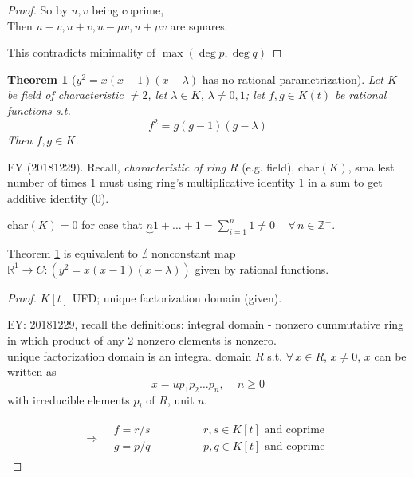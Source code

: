 \documentclass[10pt]{amsart}
\newtheorem{theorem}{Theorem}
\begin{document}
\begin{multicols*}{2}
\begin{proof}
	So by $u,v $ being coprime, \\
	\phantom{ \qquad \, } Then $u-v, u+v, u- \mu v, u + \mu v$ are squares.
	
	This contradicts minimality of $\max{(\deg{p}, \deg{q})}$


\end{proof}	





\begin{theorem}[$y^2 = x(x-1)(x-\lambda)$ has no rational parametrization]\label{Thm:SomeEqnHasNoRationalParametrization}
	Let $K$ be field of characteristic $\neq 2$, let $\lambda \in K$, $\lambda \neq 0, 1$; let $f,g \in K(t)$ be rational functions s.t.\[
	f^2 = g(g-1)(g-\lambda)
	\]
	Then $f, g\in K$. 	
\end{theorem}
	EY (20181229). Recall, \emph{characteristic of ring} $R$ (e.g. field), $\text{char}(K)$, smallest number of times $1$ must using ring's multiplicative identity $1$ in a sum to get additive identity ($0$). 
	
	$\text{char}(K) = 0$ for case that $\underbrace{n}{1 + \dots + 1} = \sum_{i=1}^n 1 \neq 0 \quad \, \forall \, n \in \mathbb{Z}^+$.  

	Theorem \ref{Thm:SomeEqnHasNoRationalParametrization} is equivalent to $\nexists $ nonconstant map $\mathbb{R}^1 \to C : (y^2 = x(x-1)(x-\lambda))$ given by rational functions.
	
	\begin{proof}
$K[t]$ UFD; unique factorization domain (given).

EY: 20181229, recall the definitions:
integral domain - nonzero cummutative ring in which product of any 2 nonzero elements is nonzero. \\
unique factorization domain is an integral domain $R$ s.t. $\forall \, x \in R$, $x\neq 0$, $x$ can be written as 
\[
x = u p_1 p_2 \dots p_n , \quad \, n \geq 0
\]		
with irreducible elements $p_i$ of $R$, unit $u$.

\[
\begin{gathered}
\Longrightarrow \begin{aligned} & f = r/s \\ & g = p /q \end{aligned} \qquad \quad \, 
\begin{aligned}
& r,s \in K[t] \text{ and coprime } \\
& p,q \in K[t] \text{ and coprime } 
\end{aligned}
\end{gathered}
\]


\end{proof}
\end{multicols*}
\end{document}
